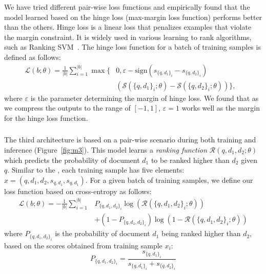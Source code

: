 We have tried different pair-wise loss functions and empirically found that the model learned based on the hinge loss (max-margin loss function) performs better than the others. 
Hinge loss is a linear loss that penalizes examples that violate the margin constraint. It is widely used in various learning to rank algorithms, such as Ranking SVM~\citep{Herbrich:1999}. The hinge loss function for a batch of training samples is defined as follows:
\begin{equation}
\begin{aligned}
\mathcal{L}(b; \theta) = \frac{1}{|b|}
\sum_{i=1}^{|b|}
\max\big\{
& 
0, \varepsilon - \text{sign}
(s_{\{q, d_1\}_i} - s_{\{q, d_2\}_i})
& \\ & 
\left(\mathcal{S}\left(\{q, d_1\}_i; \theta\right) -\mathcal{S}\left(\{q, d_2\}_i; \theta\right)\right)
\big\}
, 
\end{aligned}     
\end{equation}
where $\varepsilon$ is the parameter determining the margin of hinge loss. We found that as we compress the outputs to the range of $[-1, 1]$, $\varepsilon=1$ works well as the margin for the hinge loss function.

\subsubsection{\label{sec:modelthree}\ModelThree}
The third architecture is based on a pair-wise scenario during both training and inference (Figure~\ref{fig:m3}). This model learns a \emph{ranking function} $\mathcal{R}(q, d_1, d_2; \theta)$ which predicts the probability of document $d_1$ to be ranked higher than $d_2$ given $q$.
Similar to the \modeltwo, each training sample has five elements: $x = (q,d_1, d_2, s_{q,d_1}, s_{q,d_1})$.
For a given batch of training samples, we define our loss function based on cross-entropy as follows:
\begin{align}
\mathcal{L}(b; \theta) = -\frac{1}{|b|}
\sum_{i=1}^{|b|} &
P_{\{q,d_1,d_2\}_i} \log(\mathcal{R}(\{q,d_1,d_2\}_i; \theta)) \\
&
+ (1- P_{\{q,d_1,d_2\}_i})\log(1- \mathcal{R}(\{q,d_1,d_2\}_i; \theta)) \nonumber
\end{align}
where $P_{\{q,d_1,d_2\}_i}$ is the probability of document $d_1$ being ranked higher than $d_2$, based on the scores obtained from training sample $x_i$:
\begin{equation}
P_{\{q,d_1,d_2\}_i} = \frac{s_{\{q,d_1\}_i}}{s_{\{q,d_1\}_i} + s_{\{q,d_2\}_i}}
\end{equation}

